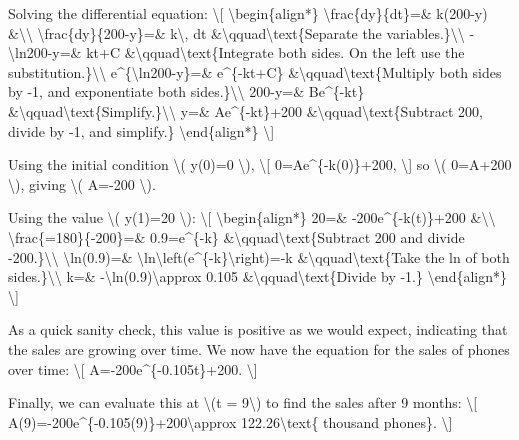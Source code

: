 Solving the differential equation: \textbackslash{}{[}
\textbackslash{}begin\{align*\} \textbackslash{}frac\{dy\}\{dt\}=\&
k(200-y) \&\textbackslash{}\textbackslash{}
\textbackslash{}frac\{dy\}\{200-y\}=\& k\textbackslash{}, dt
\&\textbackslash{}qquad\textbackslash{}text\{Separate the
variables.\}\textbackslash{}\textbackslash{}
-\textbackslash{}ln\textbar{}200-y\textbar{}=\& kt+C
\&\textbackslash{}qquad\textbackslash{}text\{Integrate both sides. On
the left use the substitution.\}\textbackslash{}\textbackslash{}
e\^{}\{\textbackslash{}ln\textbar{}200-y\textbar{}\}=\& e\^{}\{-kt+C\}
\&\textbackslash{}qquad\textbackslash{}text\{Multiply both sides by -1,
and exponentiate both sides.\}\textbackslash{}\textbackslash{} 200-y=\&
Be\^{}\{-kt\}
\&\textbackslash{}qquad\textbackslash{}text\{Simplify.\}\textbackslash{}\textbackslash{}
y=\& Ae\^{}\{-kt\}+200
\&\textbackslash{}qquad\textbackslash{}text\{Subtract 200, divide by -1,
and simplify.\} \textbackslash{}end\{align*\} \textbackslash{}{]}

Using the initial condition \textbackslash{}( y(0)=0 \textbackslash{}),
\textbackslash{}{[} 0=Ae\^{}\{-k(0)\}+200, \textbackslash{}{]} so
\textbackslash{}( 0=A+200 \textbackslash{}), giving \textbackslash{}(
A=-200 \textbackslash{}).

Using the value \textbackslash{}( y(1)=20 \textbackslash{}):
\textbackslash{}{[} \textbackslash{}begin\{align*\} 20=\&
-200e\^{}\{-k(t)\}+200 \&\textbackslash{}\textbackslash{}
\textbackslash{}frac\{=180\}\{-200\}=\& 0.9=e\^{}\{-k\}
\&\textbackslash{}qquad\textbackslash{}text\{Subtract 200 and divide
-200.\}\textbackslash{}\textbackslash{} \textbackslash{}ln(0.9)=\&
\textbackslash{}ln\textbackslash{}left(e\^{}\{-k\}\textbackslash{}right)=-k
\&\textbackslash{}qquad\textbackslash{}text\{Take the ln of both
sides.\}\textbackslash{}\textbackslash{} k=\&
-\textbackslash{}ln(0.9)\textbackslash{}approx 0.105
\&\textbackslash{}qquad\textbackslash{}text\{Divide by -1.\}
\textbackslash{}end\{align*\} \textbackslash{}{]}

As a quick sanity check, this value is positive as we would expect,
indicating that the sales are growing over time. We now have the
equation for the sales of phones over time: \textbackslash{}{[}
A=-200e\^{}\{-0.105t\}+200. \textbackslash{}{]}

Finally, we can evaluate this at \textbackslash{}(t = 9\textbackslash{})
to find the sales after 9 months: \textbackslash{}{[}
A(9)=-200e\^{}\{-0.105(9)\}+200\textbackslash{}approx
122.26\textbackslash{}text\{ thousand phones\}. \textbackslash{}{]}

